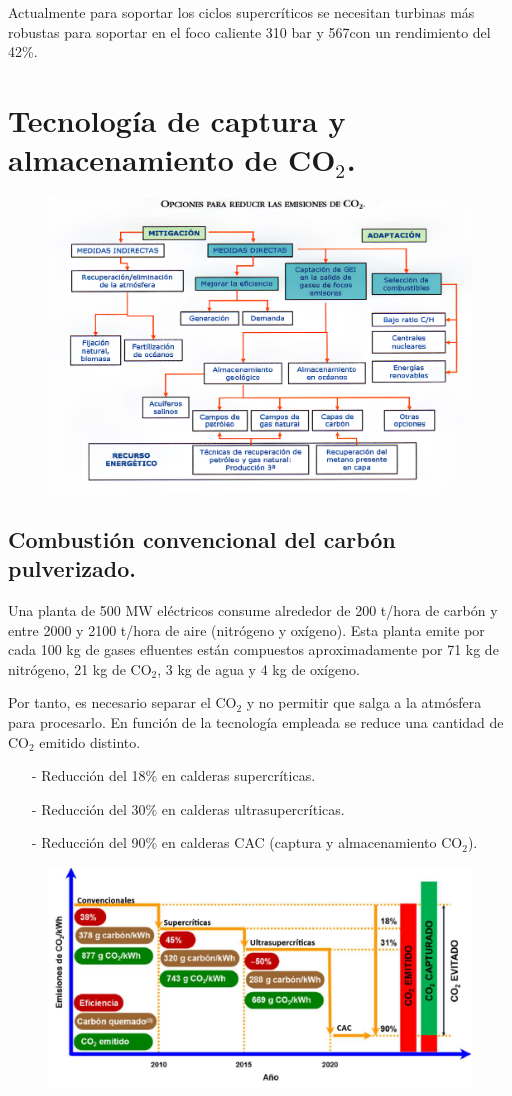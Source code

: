Actualmente para soportar los ciclos supercríticos se necesitan turbinas más robustas para soportar en el foco caliente 310 bar y 567\grado con un rendimiento del 42\%.
\newpage
\section{Tecnología de captura y almacenamiento de CO$_2$.}
\begin{figure}[H]
	\centering
	\includegraphics[width=0.7\linewidth]{res/tema3/reduccionCO2Opt}
	\label{fig:reduccionco2opt}
\end{figure}

\subsection{Combustión convencional del carbón pulverizado.}
Una planta de 500 MW eléctricos consume alrededor de 200 t/hora de carbón y entre
2000 y 2100 t/hora de aire (nitrógeno y oxígeno). Esta planta emite por cada 100 kg de gases efluentes están compuestos aproximadamente por 71 kg de
nitrógeno, 21 kg de CO$_2$, 3 kg de agua y 4 kg de oxígeno.

Por tanto, es necesario separar el CO$_2$ y no permitir que salga a la atmósfera para procesarlo. En función de la tecnología empleada se reduce una cantidad de CO$_2$ emitido distinto.
\begin{itemize}
	\item [-] Reducción del 18\% en calderas supercríticas.
	\item [-] Reducción del 30\% en calderas ultrasupercríticas.
	\item [-] Reducción del 90\% en calderas CAC (captura y almacenamiento CO$_2$).
\end{itemize}
\begin{figure}[H]
	\centering
	\includegraphics[width=0.7\linewidth]{res/tema3/comparacion calderas}
	\label{fig:comparacion-calderas}
\end{figure}

